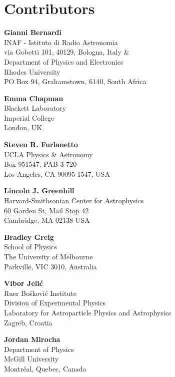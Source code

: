 
\chapter*{Contributors}



{\parskip=12pt


\noindent\textbf{Gianni Bernardi}\\
INAF - Istituto di Radio Astronomia\\
via Gobetti 101, 40129, Bologna, Italy \& \\
Department of Physics and Electronics\\
Rhodes University\\
PO Box 94, Grahamstown, 6140, South Africa


\noindent\textbf{Emma Chapman}\\
Blackett Laboratory\\
Imperial College\\
London, UK

\noindent\textbf{Steven R. Furlanetto}\\
UCLA Physics \& Astronomy\\
Box 951547, PAB 3-720\\
Los Angeles, CA 90095-1547, USA

\noindent\textbf{Lincoln J. Greenhill}\\
Harvard-Smithsonian Center for Astrophysics\\
60 Garden St, Mail Stop 42\\
Cambridge, MA 02138 USA

\noindent\textbf{Bradley Greig}\\
School of Physics\\
The University of Melbourne\\
Parkville, VIC 3010, Australia

\noindent\textbf{Vibor Jeli\'c}\\
Ru{\dj}er Bo\v{s}kovi\'{c} Institute\\
Division of Experimental Physics\\
Laboratory for Astroparticle Physics and Astrophysics\\
Zagreb, Croatia

\noindent\textbf{Jordan Mirocha}\\
Department of Physics\\
McGill University \\
Montr\'eal, Quebec, Canada

}
